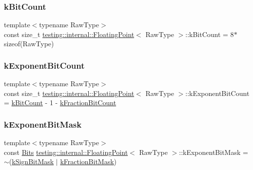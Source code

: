 \subsubsection{\texorpdfstring{kBitCount}{kBitCount}}
{\footnotesize\ttfamily template$<$typename Raw\+Type$>$ \\
const size\+\_\+t \mbox{\hyperlink{classtesting_1_1internal_1_1_floating_point}{testing\+::internal\+::\+Floating\+Point}}$<$ Raw\+Type $>$\+::k\+Bit\+Count = 8$\ast$sizeof(Raw\+Type)\hspace{0.3cm}{\ttfamily [static]}}

\mbox{\label{classtesting_1_1internal_1_1_floating_point_a1973d843c00781053d3073daa8a40119}} 
\subsubsection{\texorpdfstring{kExponentBitCount}{kExponentBitCount}}
{\footnotesize\ttfamily template$<$typename Raw\+Type$>$ \\
const size\+\_\+t \mbox{\hyperlink{classtesting_1_1internal_1_1_floating_point}{testing\+::internal\+::\+Floating\+Point}}$<$ Raw\+Type $>$\+::k\+Exponent\+Bit\+Count = \mbox{\hyperlink{classtesting_1_1internal_1_1_floating_point_ab819d2e8f93e9e482373999f0f8d71b9}{k\+Bit\+Count}} -\/ 1 -\/ \mbox{\hyperlink{classtesting_1_1internal_1_1_floating_point_a0b756a6d2a4f5f5b41ca79651c06c043}{k\+Fraction\+Bit\+Count}}\hspace{0.3cm}{\ttfamily [static]}}

\mbox{\label{classtesting_1_1internal_1_1_floating_point_a66065dfc4d5f41100f686159637af23b}} 
\subsubsection{\texorpdfstring{kExponentBitMask}{kExponentBitMask}}
{\footnotesize\ttfamily template$<$typename Raw\+Type$>$ \\
const \mbox{\hyperlink{classtesting_1_1internal_1_1_floating_point_abf228bf6cd48f12c8b44c85b4971a731}{Bits}} \mbox{\hyperlink{classtesting_1_1internal_1_1_floating_point}{testing\+::internal\+::\+Floating\+Point}}$<$ Raw\+Type $>$\+::k\+Exponent\+Bit\+Mask = $\sim$(\mbox{\hyperlink{classtesting_1_1internal_1_1_floating_point_aca98b5ea6f2222a66a82e52421682efa}{k\+Sign\+Bit\+Mask}} $\vert$ \mbox{\hyperlink{classtesting_1_1internal_1_1_floating_point_a0ac75d4ffd24f14bca452abe8a718da1}{k\+Fraction\+Bit\+Mask}})\hspace{0.3cm}{\ttfamily [static]}}

